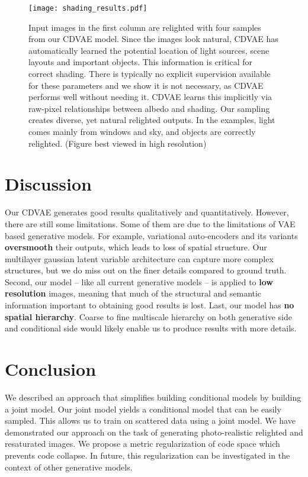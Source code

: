 \documentclass[10pt,twocolumn,letterpaper]{article}
\begin{document}
\begin{figure}[!t]
\centerline{\texttt{[image: shading\_results.pdf]}}
  \caption{Input images in the first column are relighted with four samples from our CDVAE model. Since the
   images look natural, CDVAE has automatically learned the potential location of light sources, scene 
   layouts and important objects. This information is critical for correct shading. There is typically no explicit 
   supervision available for these parameters and we show it is not necessary, as CDVAE performs well 
   without needing it. CDVAE learns this implicitly via raw-pixel relationships between albedo and 
   shading. Our sampling creates diverse, yet natural relighted outputs. In the examples, light comes mainly 
   from windows and sky,  and objects are correctly relighted. (Figure best viewed in high resolution)}
  \label{fig:shading}
\end{figure}


\section{Discussion}

Our CDVAE generates good results qualitatively and quantitatively. However, there are still some 
limitations. Some of them are due to the limitations of VAE based generative models. For example, 
variational auto-encoders and its variants {\bf oversmooth} their outputs, which leads to loss
of spatial structure. Our multilayer gaussian latent variable architecture can capture more 
complex structures, but we do miss out on the finer details compared to ground truth.  
Second, our model -- like all current generative models -- is applied to {\bf low resolution} 
images, meaning that much of the structural and semantic information important to obtaining good 
results is lost. Last, our model has {\bf no spatial hierarchy}. Coarse to fine multiscale 
hierarchy on both generative side and conditional side would likely enable us to produce
results with more details. 

\section{Conclusion}
We described an approach that simplifies building conditional models by building a 
joint model. Our joint model yields a conditional model that can be easily sampled.  This allows us 
to train on scattered data using a joint model.  We have demonstrated our approach on the task
of generating photo-realistic relighted and resaturated images. We propose a metric regularization of code
space which prevents code collapse. In future, this regularization can be investigated in the 
context of other generative models. 
\end{document}
